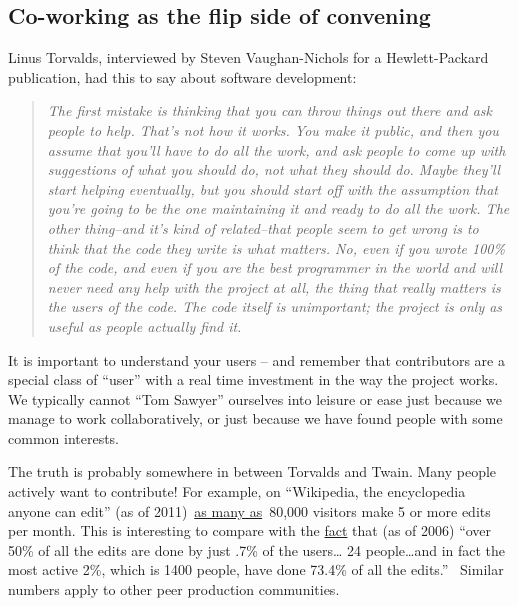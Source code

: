 \subsection{Co-working as the flip side of convening}

Linus Torvalds, interviewed by Steven Vaughan-Nichols for a
Hewlett-Packard publication, had this to say about software development:

\begin{quote}
\emph{The first mistake is thinking that you can throw things out there
and ask people to help. That's not how it works. You make it public, and
then you assume that you'll have to do all the work, and ask people to
come up with suggestions of what you should do, not what they should do.
Maybe they'll start helping eventually, but you should start off with
the assumption that you're going to be the one maintaining it and ready
to do all the work. The other thing--and it's kind of related--that
people seem to get wrong is to think that the code they write is what
matters. No, even if you wrote 100\% of the code, and even if you are
the best programmer in the world and will never need any help with the
project at all, the thing that really matters is the users of the code.
The code itself is unimportant; the project is only as useful as people
actually find it.}
\end{quote}

It is important to understand your users -- and remember that
contributors are a special class of ``user'' with a real time investment
in the way the project works. We typically cannot ``Tom Sawyer''
ourselves into leisure or ease just because we manage to work
collaboratively, or just because we have found people with some common
interests.

The truth is probably somewhere in between Torvalds and Twain. Many
people actively want to contribute! For example, on ``Wikipedia, the
encyclopedia anyone can edit'' (as of
2011)~\href{http://\%20http://www.readwriteweb.com/archives/wikipedias\_goal\_1\_billion\_monthly\_visitors\_by\_2015.php}{as
many as}~80,000 visitors make 5 or more edits per month. This is
interesting to compare with the
\href{http://www.aaronsw.com/weblog/whowriteswikipedia}{fact} that (as
of 2006) ``over 50\% of all the edits are done by just .7\% of the
users\ldots{} 24 people\ldots{}and in fact the most active 2\%, which is
1400 people, have done 73.4\% of all the edits.''~ Similar numbers apply
to other peer production communities.

